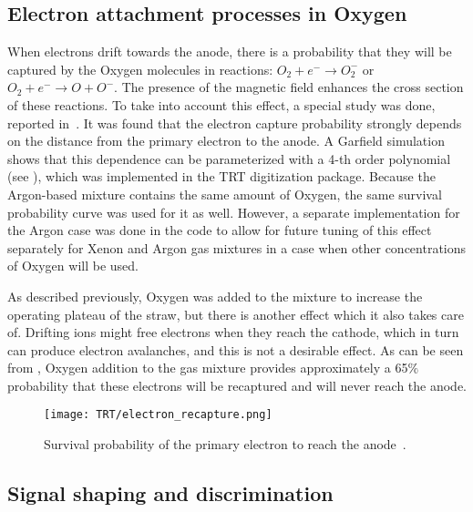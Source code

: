 \subsection{Electron attachment processes in Oxygen}
\label{subsec:recapture}
When electrons drift towards the anode, there is a probability that they will be captured by the Oxygen molecules in reactions:
$O_2 + e^- \to O_2^-$ or $O_2 + e^- \to O + O^-$. The presence of the magnetic field enhances the cross section of these reactions.
To take into account this effect, a special study was done, reported in~\cite{esben_thesis}.
It was found that the electron capture probability strongly depends on the distance from the primary electron to the anode.
A Garfield simulation shows that this dependence can be parameterized with a 4-th order polynomial (see ), 
which was implemented in the TRT digitization package. 
Because the Argon-based mixture contains the same amount of Oxygen, the same survival probability
curve was used for it as well. However, a separate implementation for the Argon case was done in the code to allow for future tuning of this effect separately for Xenon and Argon gas mixtures
in a case when other concentrations of Oxygen will be used.

As described previously, Oxygen was added to the mixture to increase the operating plateau of the straw, but there is another effect which it also takes care of.
Drifting ions might free electrons when they reach the cathode, which in turn can produce electron avalanches, and this is not a desirable effect.
As can be seen from , Oxygen addition to the gas mixture provides approximately a 65$\%$ probability that these electrons will be recaptured 
and will never reach the anode. 

\begin{figure}
\centering
\texttt{[image: TRT/electron\_recapture.png]}
\caption{ 
 Survival probability of the primary electron to reach the anode~\cite{esben_thesis}.
}
\label{fig:electron_recapture}
\end{figure}

\subsection{Signal shaping and discrimination}

